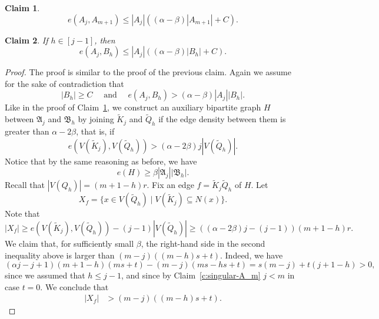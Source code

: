 \documentclass[10pt,a4paper]{amsart}
\newtheorem{claim}{Claim}
\def\fA{\mathfrak{A}}
\def\fB{\mathfrak{B}}
\begin{document}
        \begin{claim}
            \label{c:p-A-edges-in-m+1}
            $$e(A_j,A_{m+1})\leq |A_j|\left((\alpha-\beta)|A_{m+1}|+C\right).$$
        \end{claim}

        \begin{claim}
            \label{c:p-B-edges}
            If $h\in[j-1]$, then 
            $$e(A_j,B_h)\leq |A_j|((\alpha-\beta)|B_h|+C).$$
        \end{claim}

        \begin{proof}
            The proof is similar to the proof of the previous claim. Again we assume for the sake of contradiction that 
            \begin{equation}\label{eq:B_h}
                |B_h|\geq C \quad \text{ and } \quad e(A_j,B_h)> (\alpha-\beta)|A_j||B_h|.
            \end{equation}
            Like in the proof of Claim~\ref{c:p-A-edges-in-m+1}, we construct an auxiliary bipartite graph $H$ between $\fA_j$ and $\fB_h$ by joining $\tilde K_j$ and $\tilde Q_h$ if the edge density between them is greater than $\alpha-2\beta$, that is, if 
            \[e(V(\tilde K_j), V(\tilde Q_h))> (\alpha-2\beta)j|V(\tilde Q_h)|.\]
            Notice that by the same reasoning as before, we have
            \[ e(H) \geq \beta|\fA_j||\fB_h|.\]
            Recall that $|V(Q_h)| = (m+1-h)r$. Fix an edge $f=\tilde K_j \tilde Q_h$ of $H$. 
            Let 
            \[
            X_f=\{x\in V(\tilde Q_h)\mid V(\tilde K_j) \subseteq N(x)\}.
            \]
            Note that 
            \[|X_f|  \geq e(V(\tilde K_j), V(\tilde Q_h))-(j-1)|V(\tilde Q_h)|\geq ((\alpha-2\beta)j-(j-1))(m+1-h)r.\] 
            We claim that, for sufficiently small $\beta$, the right-hand side in the second inequality above is larger than $(m-j)((m-h)s+t).$ Indeed, we have
            $$(\alpha j -j+1)(m+1-h)(ms+t)-(m-j)(ms-hs+t)= s(m-j)+t(j+1-h)>0,$$
            since we assumed that $h \leq j-1$, and since by Claim~\ref{c:singular-A_m} $j<m$ in case $t=0$.
            We conclude that
            \begin{equation}
             \label{eq:size-Xf}
            \begin{split}
            |X_f| %
            & > (m-j)((m-h)s+t).
            \end{split}
            \end{equation}


\end{proof}
\end{document}
